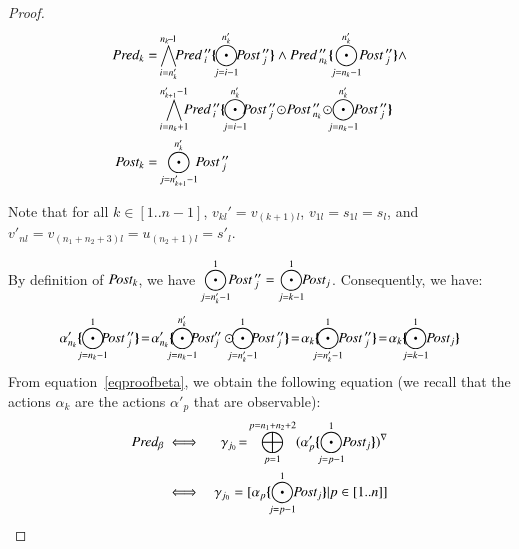 \documentclass{elsarticle}
\newcommand{\shortodot}{\!\odot\!}
\begin{document}
\begin{proof}
{\begin{align*}
\Pred_k=&\bigwedge_{i=n'_{k}}^{n_k\!-\!1}\!\!\Pred\,''_{i}\subst{\bigodot_{j=i-1}^{n'_{k}}\!\!\Post\,''_{j}}\land\Pred\,''_{n_k} \subst{\bigodot_{j=n_k-1}^{n'_{k}}\!\!\Post\,''_{j}}\land\\ 
&\bigwedge_{i=n_k+1}^{n'_{k+1}-1}\!\!\!\Pred\,''_{i}\subst{\bigodot_{j=i-1}^{n'_{k}}\!\!\!\Post\,''_{j}\shortodot\Post\,''_{n_k}\shortodot\!\!\bigodot_{j=n_k-1}^{n'_{k}}\!\!\!\Post\,''_{j}}
\\
\Post_k= &\bigodot_{j=n'_{k+1}-1}^{n'_{k}}\!\!\Post\,''_{j}
\end{align*}
}


\noindent Note that for all $k\in[1..n-1]$, $v_{kl}'=v_{(k+1)l}$,  $v_{1l}=s_{1l}=s_l$, and $v'_{nl}=v_{(n_1+n_2+3) l}=u_{(n_2+1) l} = s'_l$.

\noindent By definition of $\Post_k$, we have $\displaystyle{\bigodot_{j=n'_{k}-1}^{1}\!\!\Post\,''_{j} = \bigodot_{j=k-1}^{1}\!\!\Post_{j}}$.
Consequently,  we have:
\[\alpha'_{n_k}{\subst{\!\bigodot_{j=n_k-1}^{1}\!\!\!\!\Post\,''_{j}}} \!=\!
\alpha'_{n_k}\displaystyle{\subst{\!\!\bigodot_{j=n_k-1}^{n'_{k}}\!\!\!\!\Post''_{j}\odot\!\!\!\!\bigodot_{j=n'_{k}-1}^{1}\!\!\!\!\Post\,''_{j}}} \!=\! \alpha_k\displaystyle{\subst{\!\!\bigodot_{j=n'_{k}-1}^{1}\!\!\!\Post\,''_{j}}} \!=\! 
\alpha_k\displaystyle{\subst{\!\bigodot_{j=k-1}^{1}\!\!\Post_{j}}}\]
From equation~\ref{eqproofbeta}, we obtain the following equation (we recall that the actions $\alpha_k$ are the actions $\alpha'_{p}$ that are observable): 
\begin{eqnarray*}
\Pred_\beta &\iff& \gamma_{j_0}\!=\!
\bigoplus_{p=1}^{p=n_1+n_2+2}
\vis{\alpha'_{p}\subst{\bigodot_{j=p-1}^{1}\!\!\Post_{j}}}\\
&\iff& \gamma_{j_0}=
[\alpha_{p}\subst{\bigodot_{j=p-1}^{1}\!\!\Post_{j}}|p\in[1..n]]
\end{eqnarray*}


\end{proof}
\end{document}

